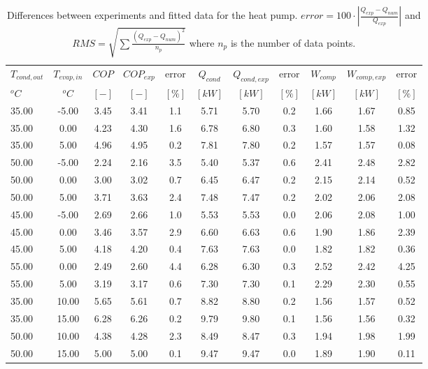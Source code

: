\documentclass[english]{SPFShortReport}
\begin{document}
\begin{table}[!ht]
\begin{small}
\caption{Differences between experiments and fitted data for the heat pump.          $error=100 \cdot |\frac{Q_{exp}-Q_{num}}{Q_{exp}}|$ and $RMS = \sqrt { \sum{\frac{(Q_{exp}-Q_{num})^2}{n_p}} }$ where $n_p$ is the number of data points.}
\begin{center}
\resizebox{12cm}{!} 
{
\begin{tabular}{l | c c c c c c c c c c } 
\hline
\hline
$T_{cond,out}$ &$T_{evap,in}$ &$COP$ &$COP_{exp}$ &error &$Q_{cond}$ &$Q_{cond,exp}$ &error &$W_{comp}$ &$W_{comp,exp}$ &error \\ 
$^oC$ &$^oC$ &$[-]$ &$[-]$ &$[\%]$ &$[kW]$ &$[kW]$ &$[\%]$ &$[kW]$ &$[kW]$ &$[\%]$\\ 
\hline
35.00  & -5.00 & 3.45 & 3.41 & 1.1 & 5.71 & 5.70 & 0.2 & 1.66 & 1.67 & 0.85\\ 
35.00  & 0.00 & 4.23 & 4.30 & 1.6 & 6.78 & 6.80 & 0.3 & 1.60 & 1.58 & 1.32\\ 
35.00  & 5.00 & 4.96 & 4.95 & 0.2 & 7.81 & 7.80 & 0.2 & 1.57 & 1.57 & 0.08\\ 
50.00  & -5.00 & 2.24 & 2.16 & 3.5 & 5.40 & 5.37 & 0.6 & 2.41 & 2.48 & 2.82\\ 
50.00  & 0.00 & 3.00 & 3.02 & 0.7 & 6.45 & 6.47 & 0.2 & 2.15 & 2.14 & 0.52\\ 
50.00  & 5.00 & 3.71 & 3.63 & 2.4 & 7.48 & 7.47 & 0.2 & 2.02 & 2.06 & 2.08\\ 
45.00  & -5.00 & 2.69 & 2.66 & 1.0 & 5.53 & 5.53 & 0.0 & 2.06 & 2.08 & 1.00\\ 
45.00  & 0.00 & 3.46 & 3.57 & 2.9 & 6.60 & 6.63 & 0.6 & 1.90 & 1.86 & 2.39\\ 
45.00  & 5.00 & 4.18 & 4.20 & 0.4 & 7.63 & 7.63 & 0.0 & 1.82 & 1.82 & 0.36\\ 
55.00  & 0.00 & 2.49 & 2.60 & 4.4 & 6.28 & 6.30 & 0.3 & 2.52 & 2.42 & 4.25\\ 
55.00  & 5.00 & 3.19 & 3.17 & 0.6 & 7.30 & 7.30 & 0.1 & 2.29 & 2.30 & 0.55\\ 
35.00  & 10.00 & 5.65 & 5.61 & 0.7 & 8.82 & 8.80 & 0.2 & 1.56 & 1.57 & 0.52\\ 
35.00  & 15.00 & 6.28 & 6.26 & 0.2 & 9.79 & 9.80 & 0.1 & 1.56 & 1.56 & 0.32\\ 
50.00  & 10.00 & 4.38 & 4.28 & 2.3 & 8.49 & 8.47 & 0.3 & 1.94 & 1.98 & 1.99\\ 
50.00  & 15.00 & 5.00 & 5.00 & 0.1 & 9.47 & 9.47 & 0.0 & 1.89 & 1.90 & 0.11\\ 

\end{tabular}}
\end{center}
\end{small}
\end{table}
\end{document}
